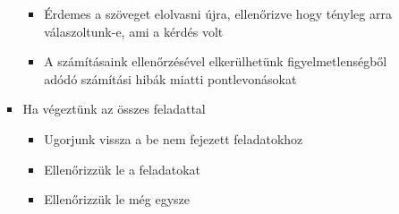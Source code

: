 \documentclass[../Main.tex]{subfiles}
\begin{document}
\begin{itemize}
\begin{itemize}
\begin{itemize}
            \begin{itemize}
                \item Érdemes a szöveget elolvasni újra, ellenőrizve hogy tényleg
                arra válaszoltunk-e, ami a kérdés volt
                \item A számításaink ellenőrzésével elkerülhetünk
                figyelmetlenségből adódó számítási hibák miatti
                pontlevonásokat
            \end{itemize}
            \item Ha végeztünk az összes feladattal
            \begin{itemize}
                \item Ugorjunk vissza a be nem fejezett feladatokhoz
                \item Ellenőrizzük le a feladatokat
                \item Ellenőrizzük le még egysze
            \end{itemize}
        \end{itemize}
    \end{itemize}
\end{itemize}
\end{document}
